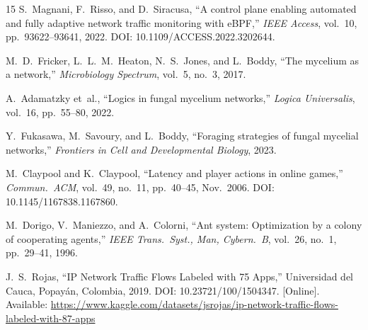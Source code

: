 \documentclass[conference]{IEEEtran}
\begin{document}
\begin{thebibliography}{15}
S.~Magnani, F.~Risso, and D.~Siracusa,
``A control plane enabling automated and fully adaptive network traffic
monitoring with eBPF,''
\emph{IEEE Access}, vol.~10, pp.~93622--93641, 2022.
DOI: 10.1109/ACCESS.2022.3202644.

M.~D.~Fricker, L.~L.~M.~Heaton, N.~S.~Jones, and L.~Boddy,
``The mycelium as a network,''
\emph{Microbiology Spectrum}, vol.~5, no.~3, 2017.

A.~Adamatzky et~al.,
``Logics in fungal mycelium networks,''
\emph{Logica Universalis}, vol.~16, pp.~55--80, 2022.

Y.~Fukasawa, M.~Savoury, and L.~Boddy,
``Foraging strategies of fungal mycelial networks,''
\emph{Frontiers in Cell and Developmental Biology}, 2023.

M.~Claypool and K.~Claypool,
``Latency and player actions in online games,''
\emph{Commun.\ ACM}, vol.~49, no.~11, pp.~40--45, Nov.\ 2006.
DOI: 10.1145/1167838.1167860.

M.~Dorigo, V.~Maniezzo, and A.~Colorni,
``Ant system: Optimization by a colony of cooperating agents,''
\emph{IEEE Trans.\ Syst., Man, Cybern.\ B}, vol.~26, no.~1, pp.~29--41, 1996.

J.~S.~Rojas,
``IP Network Traffic Flows Labeled with 75 Apps,''
Universidad del Cauca, Popayán, Colombia, 2019.
DOI: 10.23721/100/1504347.
[Online]. Available: \url{https://www.kaggle.com/datasets/jsrojas/ip-network-traffic-flows-labeled-with-87-apps}

\end{thebibliography}
\end{document}
